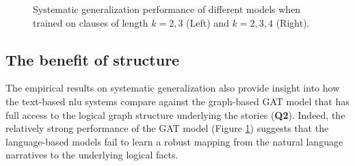 \documentclass[letterpaper, 12pt]{report}
\begin{document}
\begin{figure}[!htb]
     \centering
    \qquad
    \hspace{-20pt}
    \caption{Systematic generalization performance of different models when trained on clauses of length $k=2,3$ (Left) and $k=2,3,4$ (Right).}
    \label{fig:gen_1}
\end{figure}



\subsection{The benefit of structure}
\label{sec:clutrr_structure}

The empirical results on systematic generalization also provide insight into how the text-based \acrshort{nlu} systems compare against the graph-based GAT model that has full access to the logical graph structure underlying the stories (\textbf{Q2}).
Indeed, the relatively strong performance of the GAT model (Figure \ref{fig:gen_1}) suggests that the language-based models fail to learn a robust mapping from the natural language narratives to the underlying logical facts.
\end{document}
